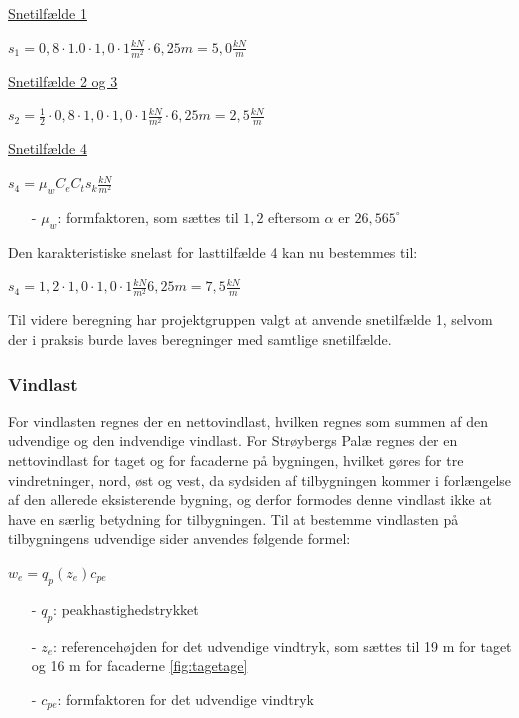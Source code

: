 \underline{Snetilfælde 1}
\begin{center}
$s_1=0,\!8\cdot 1.0\cdot 1,\!0\cdot 1 \frac{kN}{m^2}\cdot 6,\!25 m=5,\!0 \frac{kN}{m}$
\end{center}
\underline{Snetilfælde 2 og 3}
\begin{center}
$s_2=\frac{1}{2}\cdot 0,\!8\cdot 1,\!0\cdot 1,\!0\cdot 1 \frac{kN}{m^2}\cdot 6,\!25 m=2,\!5 \frac{kN}{m}$
\end{center}
\underline{Snetilfælde 4}
\begin{center}
	$s_4=\mu_wC_eC_ts_k \frac{kN}{m^2}$
\end{center}
\begin{itemize}
	\item[-] $\mu_w$: formfaktoren, som sættes til $1,\!2$ eftersom $\alpha$ er $26,\!565^{\circ}$ \citep[ kapitel 5.3.3]{EU91}
\end{itemize}
Den karakteristiske snelast for lasttilfælde 4 kan nu bestemmes til:
\begin{center}
	$s_4=1,\!2\cdot 1,\!0\cdot 1,\!0\cdot 1 \frac{kN}{m^2}6,\!25 m=7,\!5 \frac{kN}{m}$
\end{center}
Til videre beregning har projektgruppen valgt at anvende snetilfælde 1, selvom der i praksis burde laves beregninger med samtlige snetilfælde.

\subsubsection{Vindlast}
For vindlasten regnes der en nettovindlast, hvilken regnes som summen af den udvendige og den indvendige vindlast.
\newline \indent{     }  For Strøybergs Palæ regnes der en nettovindlast for taget og for facaderne på bygningen, hvilket gøres for tre vindretninger, nord, øst og vest, da sydsiden af tilbygningen kommer i forlængelse af den allerede eksisterende bygning, og derfor formodes denne vindlast ikke at have en særlig betydning for tilbygningen.
\newline
\newline
Til at bestemme vindlasten på tilbygningens udvendige sider anvendes følgende formel:	
\begin{center} 
	$w_e=q_p(z_e)c_{pe}$
\end{center}
\begin{itemize}
	\item[-] $q_p$: peakhastighedstrykket
	\item[-] $z_e$: referencehøjden for det udvendige vindtryk, som sættes til 19 m for taget og 16 m for facaderne \ref{fig:tagetage}
	\item[-] $c_{pe}$: formfaktoren for det udvendige vindtryk
\end{itemize}

